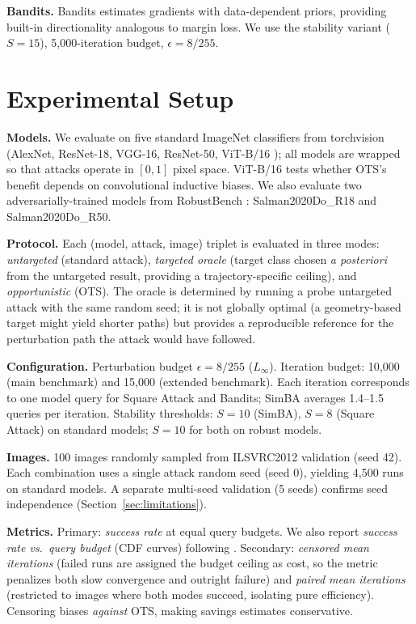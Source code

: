 \documentclass{cap2026}
\begin{document}
\textbf{Bandits.} Bandits \citep{ilyas2019prior} estimates gradients with data-dependent priors, providing built-in directionality analogous to margin loss. We use the stability variant ($S = 15$), 5,000-iteration budget, $\epsilon = 8/255$.

\section{Experimental Setup}\label{sec:setup}

\textbf{Models.} We evaluate on five standard ImageNet classifiers from torchvision (AlexNet, ResNet-18, VGG-16, ResNet-50, ViT-B/16 \citep{dosovitskiy2021image}); all models are wrapped so that attacks operate in $[0, 1]$ pixel space. ViT-B/16 tests whether OTS's benefit depends on convolutional inductive biases. We also evaluate two adversarially-trained models from RobustBench \citep{salman2020adversarially,croce2021robustbench}: Salman2020Do\_R18 and Salman2020Do\_R50.

\textbf{Protocol.} Each (model, attack, image) triplet is evaluated in three modes: \textit{untargeted} (standard attack), \textit{targeted oracle} (target class chosen \textit{a posteriori} from the untargeted result, providing a trajectory-specific ceiling), and \textit{opportunistic} (OTS). The oracle is determined by running a probe untargeted attack with the same random seed; it is not globally optimal (a geometry-based target might yield shorter paths) but provides a reproducible reference for the perturbation path the attack would have followed.

\textbf{Configuration.} Perturbation budget $\epsilon = 8/255$ ($L_\infty$). Iteration budget: 10,000 (main benchmark) and 15,000 (extended benchmark). Each iteration corresponds to one model query for Square Attack and Bandits; SimBA averages 1.4--1.5 queries per iteration. Stability thresholds: $S = 10$ (SimBA), $S = 8$ (Square Attack) on standard models; $S = 10$ for both on robust models.

\textbf{Images.} 100 images randomly sampled from ILSVRC2012 validation (seed 42). Each combination uses a single attack random seed (seed 0), yielding 4,500 runs on standard models. A separate multi-seed validation (5 seeds) confirms seed independence (Section~\ref{sec:limitations}).

\textbf{Metrics.} Primary: \textit{success rate} at equal query budgets. We also report \textit{success rate vs.\ query budget} (CDF curves) following \citet{ughi2021empirical}. Secondary: \textit{censored mean iterations} (failed runs are assigned the budget ceiling as cost, so the metric penalizes both slow convergence and outright failure) and \textit{paired mean iterations} (restricted to images where both modes succeed, isolating pure efficiency). Censoring biases \emph{against} OTS, making savings estimates conservative.
\end{document}

